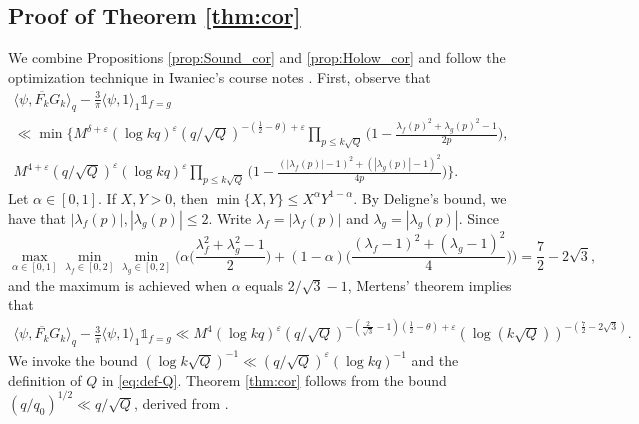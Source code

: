 \documentclass[12pt,reqno]{amsart}
\theoremstyle{remark}
\numberwithin{equation}{section}
\begin{document}
 
	\subsection{Proof of Theorem \ref{thm:cor}}
        \label{subsec:proof_of_thm:cor}
 
		We combine Propositions \ref{prop:Sound_cor}  and \ref{prop:Holow_cor} and follow the optimization technique in Iwaniec's course notes \cite{Iwaniec}. First, observe that 
		\begin{multline*}
			\langle \psi, \overline{F_k}G_k \rangle_q -   \frac{3}{\pi}\langle \psi , 1 \rangle_1\mathds{1}_{f=g}\\ \ll \min\Big \{M^{\delta+\varepsilon}(\log kq)^{\varepsilon}(q/\sqrt{Q})^{-(\frac{1}{2}-\theta)+\varepsilon} \prod_{p \le k\sqrt{Q}}\Big(1-\frac{\lambda_f(p)^2+ \lambda_g(p)^2-1}{2p}\Big),\\ 
			M^{4+\varepsilon}(q/\sqrt{Q})^{\varepsilon} (\log kq)^{\varepsilon}  \prod_{p \le k\sqrt{Q}} \Big(1-\frac{(|\lambda_f(p)|-1)^2+(|\lambda_g(p)|-1)^2}{4p}\Big)\Big\}.
		\end{multline*}
        Let $\alpha \in [0,1]$. If $X,Y>0$, then $\min\{X,Y\}\leq X^{\alpha}Y^{1-\alpha}$. By Deligne's bound, we have that $|\lambda_f(p)|, |\lambda_g(p)| \leq 2$.  Write $\lambda_f = |\lambda_f(p)|$ and $\lambda_g = |\lambda_g(p)|$. Since
        \[
           \max_{\alpha\in[0,1]}\min_{\lambda_f \in[0,2]}\min_{\lambda_g \in[0,2]}\Big(\alpha\Big(\frac{\lambda_f^2+\lambda_g^2-1}{2}\Big)  +(1-\alpha)\Big(\frac{(\lambda_f-1)^2+(\lambda_g-1)^2}{4}\Big)\Big) = \frac{7}{2}-2\sqrt{3},
        \]
    and the maximum is achieved when $\alpha$ equals $2/\sqrt{3}-1$,
   Mertens' theorem implies that
    \begin{equation}
        \label{eq:sound-cor-combine}
        \begin{aligned}
        \langle \psi, \overline{F_k}G_k \rangle_q -   \frac{3}{\pi}\langle \psi , 1 \rangle_1\mathds{1}_{f=g} 
        \ll M^4
        (\log kq)^{\varepsilon}(q/\sqrt{Q})^{-(\frac{2}{\sqrt{3}}-1)(\frac{1}{2}-\theta)+\varepsilon} ({\log(k\sqrt{Q})})^{-(\frac{7}{2}-2\sqrt{3})}.
        \end{aligned}
    \end{equation}
 We invoke the bound $(\log k\sqrt{Q})^{-1}\ll (q/\sqrt{Q})^{\varepsilon}(\log kq)^{-1}$ and the definition of $Q$ in \eqref{eq:def-Q}. Theorem \ref{thm:cor} follows from the bound $(q/q_0)^{1/2} \ll q/\sqrt{Q}$, derived from \cite[Proposition 2.5]{NPS}. 
\end{document}
